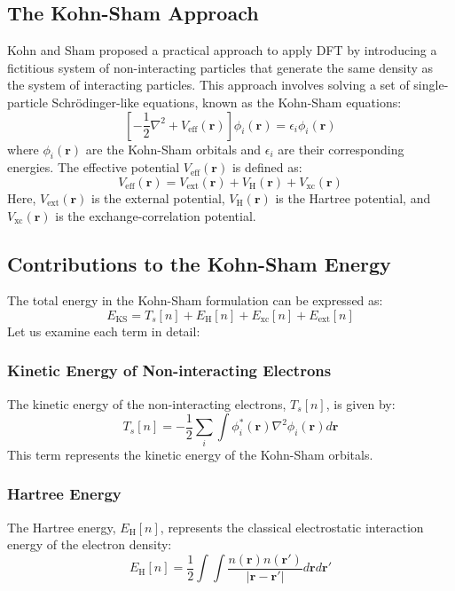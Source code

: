\subsection{The Kohn-Sham Approach}
Kohn and Sham proposed a practical approach to apply DFT by introducing a fictitious system of non-interacting particles that generate the same density as the system of interacting particles. This approach involves solving a set of single-particle Schrödinger-like equations, known as the Kohn-Sham equations:
\begin{equation}
\left[-\frac{1}{2}\nabla^2 + V_{\text{eff}}(\mathbf{r})\right]\phi_i(\mathbf{r}) = \epsilon_i\phi_i(\mathbf{r})
\end{equation}
where $\phi_i(\mathbf{r})$ are the Kohn-Sham orbitals and $\epsilon_i$ are their corresponding energies. The effective potential $V_{\text{eff}}(\mathbf{r})$ is defined as:
\begin{equation}
V_{\text{eff}}(\mathbf{r}) = V_{\text{ext}}(\mathbf{r}) + V_{\text{H}}(\mathbf{r}) + V_{\text{xc}}(\mathbf{r})
\end{equation}
Here, $V_{\text{ext}}(\mathbf{r})$ is the external potential, $V_{\text{H}}(\mathbf{r})$ is the Hartree potential, and $V_{\text{xc}}(\mathbf{r})$ is the exchange-correlation potential.
\subsection{Contributions to the Kohn-Sham Energy}
The total energy in the Kohn-Sham formulation can be expressed as:
\begin{equation}
E_{\text{KS}} = T_s[n] + E_{\text{H}}[n] + E_{\text{xc}}[n] + E_{\text{ext}}[n]
\end{equation}
Let us examine each term in detail:
\subsubsection{Kinetic Energy of Non-interacting Electrons}
The kinetic energy of the non-interacting electrons, $T_s[n]$, is given by:
\begin{equation}
T_s[n] = -\frac{1}{2}\sum_i \int \phi_i^*(\mathbf{r})\nabla^2\phi_i(\mathbf{r})d\mathbf{r}
\end{equation}
This term represents the kinetic energy of the Kohn-Sham orbitals.
\subsubsection{Hartree Energy}
The Hartree energy, $E_{\text{H}}[n]$, represents the classical electrostatic interaction energy of the electron density:
\begin{equation}
E_{\text{H}}[n] = \frac{1}{2}\int\int \frac{n(\mathbf{r})n(\mathbf{r'})}{|\mathbf{r}-\mathbf{r'}|}d\mathbf{r}d\mathbf{r'}
\end{equation}
